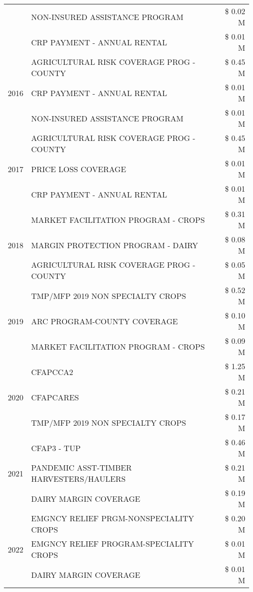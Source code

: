 \begin{tabular}{llr}
 & NON-INSURED ASSISTANCE PROGRAM & \$ 0.02 M \\
 & CRP PAYMENT - ANNUAL RENTAL & \$ 0.01 M \\
\cline{1-3}
\multirow[t]{3}{*}{2016} & AGRICULTURAL RISK COVERAGE PROG - COUNTY & \$ 0.45 M \\
 & CRP PAYMENT - ANNUAL RENTAL & \$ 0.01 M \\
 & NON-INSURED ASSISTANCE PROGRAM & \$ 0.01 M \\
\cline{1-3}
\multirow[t]{3}{*}{2017} & AGRICULTURAL RISK COVERAGE PROG - COUNTY & \$ 0.45 M \\
 & PRICE LOSS COVERAGE & \$ 0.01 M \\
 & CRP PAYMENT - ANNUAL RENTAL & \$ 0.01 M \\
\cline{1-3}
\multirow[t]{3}{*}{2018} & MARKET FACILITATION PROGRAM - CROPS & \$ 0.31 M \\
 & MARGIN PROTECTION PROGRAM - DAIRY & \$ 0.08 M \\
 & AGRICULTURAL RISK COVERAGE PROG - COUNTY & \$ 0.05 M \\
\cline{1-3}
\multirow[t]{3}{*}{2019} & TMP/MFP 2019 NON SPECIALTY CROPS & \$ 0.52 M \\
 & ARC PROGRAM-COUNTY COVERAGE & \$ 0.10 M \\
 & MARKET FACILITATION PROGRAM - CROPS & \$ 0.09 M \\
\cline{1-3}
\multirow[t]{3}{*}{2020} & CFAPCCA2 & \$ 1.25 M \\
 & CFAPCARES & \$ 0.21 M \\
 & TMP/MFP 2019 NON SPECIALTY CROPS & \$ 0.17 M \\
\cline{1-3}
\multirow[t]{3}{*}{2021} & CFAP3 - TUP & \$ 0.46 M \\
 & PANDEMIC ASST-TIMBER HARVESTERS/HAULERS & \$ 0.21 M \\
 & DAIRY MARGIN COVERAGE & \$ 0.19 M \\
\cline{1-3}
\multirow[t]{3}{*}{2022} & EMGNCY RELIEF PRGM-NONSPECIALITY CROPS & \$ 0.20 M \\
 & EMGNCY RELIEF PROGRAM-SPECIALITY CROPS & \$ 0.01 M \\
 & DAIRY MARGIN COVERAGE & \$ 0.01 M \\
\cline{1-3}
\bottomrule
\end{tabular}
